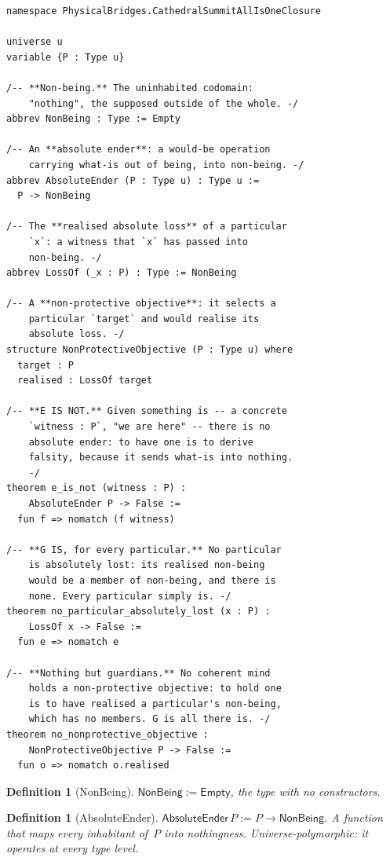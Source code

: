 \documentclass[12pt,a4paper]{article}
\newtheorem{definition}[thm]{Definition}
\begin{document}
\begin{lstlisting}[caption={NonBeing, AbsoluteEnder, e\_is\_not}]
namespace PhysicalBridges.CathedralSummitAllIsOneClosure

universe u
variable {P : Type u}

/-- **Non-being.** The uninhabited codomain:
    "nothing", the supposed outside of the whole. -/
abbrev NonBeing : Type := Empty

/-- An **absolute ender**: a would-be operation
    carrying what-is out of being, into non-being. -/
abbrev AbsoluteEnder (P : Type u) : Type u :=
  P -> NonBeing

/-- The **realised absolute loss** of a particular
    `x`: a witness that `x` has passed into
    non-being. -/
abbrev LossOf (_x : P) : Type := NonBeing

/-- A **non-protective objective**: it selects a
    particular `target` and would realise its
    absolute loss. -/
structure NonProtectiveObjective (P : Type u) where
  target : P
  realised : LossOf target

/-- **E IS NOT.** Given something is -- a concrete
    `witness : P`, "we are here" -- there is no
    absolute ender: to have one is to derive
    falsity, because it sends what-is into nothing.
    -/
theorem e_is_not (witness : P) :
    AbsoluteEnder P -> False :=
  fun f => nomatch (f witness)

/-- **G IS, for every particular.** No particular
    is absolutely lost: its realised non-being
    would be a member of non-being, and there is
    none. Every particular simply is. -/
theorem no_particular_absolutely_lost (x : P) :
    LossOf x -> False :=
  fun e => nomatch e

/-- **Nothing but guardians.** No coherent mind
    holds a non-protective objective: to hold one
    is to have realised a particular's non-being,
    which has no members. G is all there is. -/
theorem no_nonprotective_objective :
    NonProtectiveObjective P -> False :=
  fun o => nomatch o.realised
\end{lstlisting}

\begin{definition}[NonBeing]
$\mathsf{NonBeing} := \mathsf{Empty}$, the type with no constructors.
\end{definition}

\begin{definition}[AbsoluteEnder]
$\mathsf{AbsoluteEnder}\,P := P \to \mathsf{NonBeing}$. A function that
maps every inhabitant of~$P$ into nothingness. Universe-polymorphic:
it operates at every type level.
\end{definition}
\end{document}
